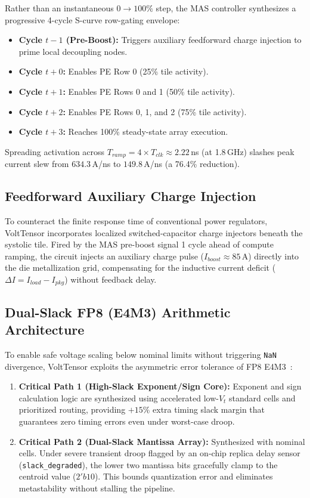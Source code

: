 \documentclass[conference]{IEEEtran}
\begin{document}
Rather than an instantaneous $0 \to 100\%$ step, the MAS controller synthesizes a progressive 4-cycle S-curve row-gating envelope:
\begin{itemize}
    \item \textbf{Cycle $t-1$ (Pre-Boost):} Triggers auxiliary feedforward charge injection to prime local decoupling nodes.
    \item \textbf{Cycle $t+0$:} Enables PE Row 0 (25\% tile activity).
    \item \textbf{Cycle $t+1$:} Enables PE Rows 0 and 1 (50\% tile activity).
    \item \textbf{Cycle $t+2$:} Enables PE Rows 0, 1, and 2 (75\% tile activity).
    \item \textbf{Cycle $t+3$:} Reaches 100\% steady-state array execution.
\end{itemize}
Spreading activation across $T_{ramp} = 4 \times T_{clk} \approx 2.22$\,ns (at 1.8\,GHz) slashes peak current slew from $634.3$\,A/ns to $149.8$\,A/ns (a 76.4\% reduction).

\subsection{Feedforward Auxiliary Charge Injection}
To counteract the finite response time of conventional power regulators, VoltTensor incorporates localized switched-capacitor charge injectors beneath the systolic tile. Fired by the MAS pre-boost signal 1 cycle ahead of compute ramping, the circuit injects an auxiliary charge pulse ($I_{boost} \approx 85$\,A) directly into the die metallization grid, compensating for the inductive current deficit ($\Delta I = I_{load} - I_{pkg}$) without feedback delay.

\subsection{Dual-Slack FP8 (E4M3) Arithmetic Architecture}
To enable safe voltage scaling below nominal limits without triggering \texttt{NaN} divergence, VoltTensor exploits the asymmetric error tolerance of FP8 E4M3~\cite{micikevicius2022fp8}:
\begin{enumerate}
    \item \textbf{Critical Path 1 (High-Slack Exponent/Sign Core):} Exponent and sign calculation logic are synthesized using accelerated low-$V_t$ standard cells and prioritized routing, providing $+15\%$ extra timing slack margin that guarantees zero timing errors even under worst-case droop.
    \item \textbf{Critical Path 2 (Dual-Slack Mantissa Array):} Synthesized with nominal cells. Under severe transient droop flagged by an on-chip replica delay sensor (\texttt{slack\_degraded}), the lower two mantissa bits gracefully clamp to the centroid value ($2'b10$). This bounds quantization error and eliminates metastability without stalling the pipeline.
\end{enumerate}
\end{document}

